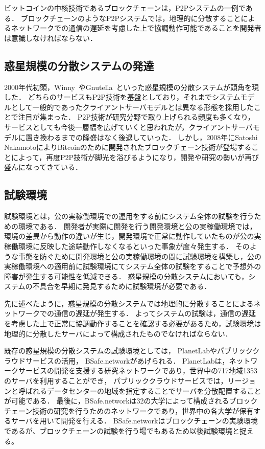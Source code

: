 ビットコインの中核技術であるブロックチェーンは，P2Pシステムの一例である．
ブロックチェーンのようなP2Pシステムでは，地理的に分散することによるネットワークでの通信の遅延を考慮した上で協調動作可能であることを開発者は意識しなければならない．

\subsection{惑星規模の分散システムの発達}

2000年代初頭，Winny~\cite{Winny}やGnutella~\cite{Gnutella}といった惑星規模の分散システムが頭角を現した．
どちらのサービスもP2P技術を基盤としており，それまでシステムモデルとして一般的であったクライアントサーバモデルとは異なる形態を採用したことで注目が集まった．
P2P技術が研究分野で取り上げられる頻度も多くなり，サービスとしても今後一層幅を広げていくと思われたが，クライアントサーバモデルに置き換わるまでの隆盛はなく後退していった．
しかし，2008年にSatoshi NakamotoによりBitcoinのために開発されたブロックチェーン技術が登場することによって，再度P2P技術が脚光を浴びるようになり，開発や研究の勢いが再び盛んになってきている．

\subsection{試験環境}

試験環境とは，公の実稼働環境での運用をする前にシステム全体の試験を行うための環境である．
開発者が実際に開発を行う開発環境と公の実稼働環境では，環境の差異から動作の違いが生じ，開発環境で正常に動作していたものが公の実稼働環境に反映した途端動作しなくなるといった事象が度々発生する．
そのような事態を防ぐために開発環境と公の実稼働環境の間に試験環境を構築し，公の実稼働環境への適用前に試験環境にてシステム全体の試験をすることで予想外の障害が発生する可能性を低減できる．
惑星規模の分散システムにおいても，システムの不具合を早期に発見するために試験環境が必要である．

先に述べたように，惑星規模の分散システムでは地理的に分散することによるネットワークでの通信の遅延が発生する．
よってシステムの試験は，通信の遅延を考慮した上で正常に協調動作することを確認する必要があるため，試験環境は地理的に分散したサーバによって構成されたものでなければならない．

既存の惑星規模の分散システムの試験環境としては， PlanetLabやパブリッククラウドサービスの活用， BSafe.networkがあげられる．
PlanetLabは，ネットワークサービスの開発を支援する研究ネットワークであり，世界中の717地域1353のサーバを利用することができ，
パブリッククラウドサービスでは，リージョンと呼ばれるデータセンターの地域を指定することでサーバを分散配置することが可能である．
最後に，BSafe.networkは32の大学によって構成されるブロックチェーン技術の研究を行うためのネットワークであり，世界中の各大学が保有するサーバを用いて開発を行える．
BSafe.networkはブロックチェーンの実験環境であるが、ブロックチェーンの試験を行う場でもあるため以後試験環境と捉える。

